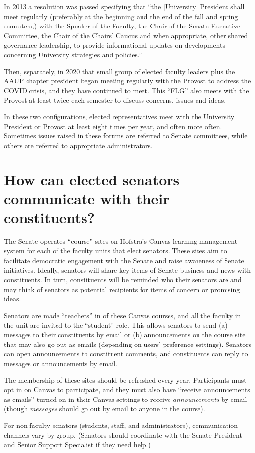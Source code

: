 \documentclass[12pt]{article}
\begin{document}
In 2013 a
\href{https://www.hofstra.edu/pdf/faculty/senate/senate_resolution_informational_meetings.pdf}{resolution}
was passed specifying that ``the {[}University{]} President shall meet
regularly (preferably at the beginning and the end of the fall and
spring semesters,) with the Speaker of the Faculty, the Chair of the
Senate Executive Committee, the Chair of the Chairs' Caucus and when
appropriate, other shared governance leadership, to provide
informational updates on developments concerning University strategies
and policies.''

Then, separately, in 2020 that small group of elected faculty leaders
plus the AAUP chapter president began meeting regularly with the Provost
to address the COVID crisis, and they have continued to meet. This
``FLG'' also meets with the Provost at least twice each semester to
discuss concerns, issues and ideas.

In these two configurations, elected representatives meet with the
University President or Provost at least eight times per year, and often
more often. Sometimes issues raised in these forums are referred to
Senate committees, while others are referred to appropriate
administrators.

\section{How can elected senators communicate with their
constituents?}\label{how-can-elected-senators-communicate-with-their-constituents}

The Senate operates ``course'' sites on Hofstra's Canvas learning
management system for each of the faculty units that elect senators.
These sites aim to facilitate democratic engagement with the Senate and
raise awareness of Senate initiatives. Ideally, senators will share key
items of Senate business and news with constituents. In turn,
constituents will be reminded who their senators are and may think of
senators as potential recipients for items of concern or promising
ideas.

Senators are made ``teachers'' in of these Canvas courses, and all the
faculty in the unit are invited to the ``student'' role. This allows
senators to send (a) messages to their constituents by email or (b)
announcements on the course site that may also go out as emails
(depending on users' preference settings). Senators can open
announcements to constituent comments, and constituents can reply to
messages or announcements by email.

The membership of these sites should be refreshed every year.
Participants must opt in on Canvas to participate, and they must also
have ``receive announcements as emails'' turned on in their Canvas
settings to receive \emph{announcements} by email (though \emph{messages} should
go out by email to anyone in the course).

For non-faculty senators (students, staff, and administrators),
communication channels vary by group. (Senators should coordinate with
the Senate President and Senior Support Specialist if they need help.)
\end{document}
